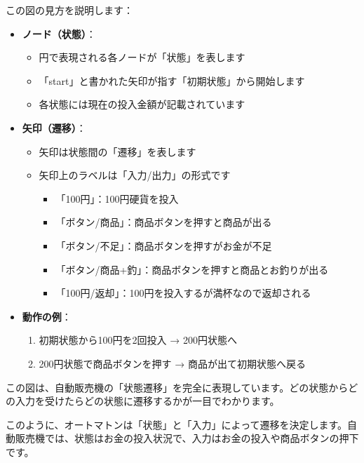 この図の見方を説明します：

\begin{itemize}
\tightlist
\item
  \textbf{ノード（状態）}：

  \begin{itemize}
  \tightlist
  \item
    円で表現される各ノードが「状態」を表します
  \item
    「start」と書かれた矢印が指す「初期状態」から開始します
  \item
    各状態には現在の投入金額が記載されています
  \end{itemize}
\item
  \textbf{矢印（遷移）}：

  \begin{itemize}
  \tightlist
  \item
    矢印は状態間の「遷移」を表します
  \item
    矢印上のラベルは「入力/出力」の形式です

    \begin{itemize}
    \tightlist
    \item
      「100円」：100円硬貨を投入
    \item
      「ボタン/商品」：商品ボタンを押すと商品が出る
    \item
      「ボタン/不足」：商品ボタンを押すがお金が不足
    \item
      「ボタン/商品+釣」：商品ボタンを押すと商品とお釣りが出る
    \item
      「100円/返却」：100円を投入するが満杯なので返却される
    \end{itemize}
  \end{itemize}
\item
  \textbf{動作の例}：

  \begin{enumerate}
  \def\labelenumi{\arabic{enumi}.}
  \tightlist
  \item
    初期状態から100円を2回投入 → 200円状態へ
  \item
    200円状態で商品ボタンを押す → 商品が出て初期状態へ戻る
  \end{enumerate}
\end{itemize}

この図は、自動販売機の「状態遷移」を完全に表現しています。どの状態からどの入力を受けたらどの状態に遷移するかが一目でわかります。

このように、オートマトンは「状態」と「入力」によって遷移を決定します。自動販売機では、状態はお金の投入状況で、入力はお金の投入や商品ボタンの押下です。

